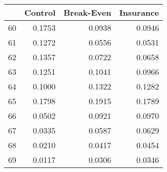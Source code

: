 \begin{tabular}{lrrr}
\toprule
{} &  Control &  Break-Even &  Insurance \\
\midrule
60 &   0.1753 &      0.0938 &     0.0946 \\
61 &   0.1272 &      0.0556 &     0.0531 \\
62 &   0.1357 &      0.0722 &     0.0658 \\
63 &   0.1251 &      0.1041 &     0.0966 \\
64 &   0.1000 &      0.1322 &     0.1282 \\
65 &   0.1798 &      0.1915 &     0.1789 \\
66 &   0.0502 &      0.0921 &     0.0970 \\
67 &   0.0335 &      0.0587 &     0.0629 \\
68 &   0.0210 &      0.0417 &     0.0454 \\
69 &   0.0117 &      0.0306 &     0.0346 \\
\bottomrule
\end{tabular}
